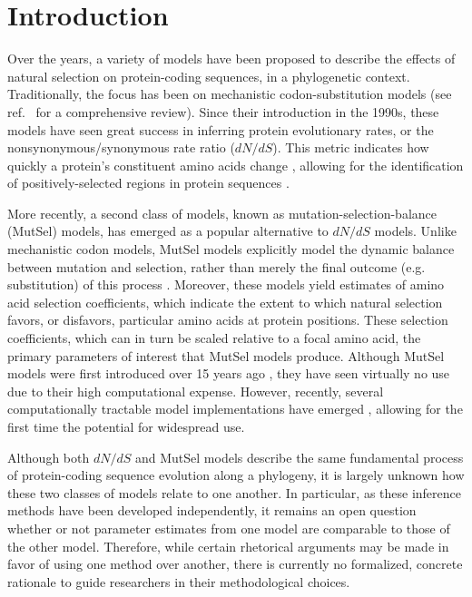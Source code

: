 \documentclass[11pt]{article}
\begin{document}
\section*{Introduction}

Over the years, a variety of models have been proposed to describe the effects of natural selection on protein-coding sequences, in a phylogenetic context. Traditionally, the focus has been on mechanistic codon-substitution models (see ref.~\cite{Anisimova2009} for a comprehensive review). Since their introduction in the 1990s, these models have seen great success in inferring protein evolutionary rates, or the nonsynonymous/synonymous rate ratio ($dN/dS$). This metric indicates how quickly a protein's constituent amino acids change \cite{GoldmanYang1994, MuseGaut1994, NielsenYang1998}, allowing for the identification of positively-selected regions in protein sequences \cite{ NielsenYang1998,Yangetal2000}. 

More recently, a second class of models, known as mutation-selection-balance (MutSel) models, has emerged as a popular alternative to $dN/dS$ models. Unlike mechanistic codon models, MutSel models explicitly model the dynamic balance between mutation and selection, rather than merely the final outcome (e.g. substitution) of this process \cite{HalpernBruno1998, YangNielsen2008, Rodrigueetal2010, Tamurietal2012}. Moreover, these models yield estimates of amino acid selection coefficients, which indicate the extent to which natural selection favors, or disfavors, particular amino acids at protein positions. These selection coefficients, which can in turn be scaled relative to a focal amino acid, the primary parameters of interest that MutSel models produce. Although MutSel models were first introduced over 15 years ago \cite{HalpernBruno1998}, they have seen virtually no use due to their high computational expense. However, recently, several computationally tractable model implementations have emerged \cite{RodrigueLartillot2014,Tamurietal2014}, allowing for the first time the potential for widespread use. 

Although both $dN/dS$ and MutSel models describe the same fundamental process of protein-coding sequence evolution along a phylogeny, it is largely unknown how these two classes of models relate to one another. In particular, as these inference methods have been developed independently, it remains an open question whether or not parameter estimates from one model are comparable to those of the other model. Therefore, while certain rhetorical arguments may be made in favor of using one method over another, there is currently no formalized, concrete rationale to guide researchers in their methodological choices. 
\end{document}
